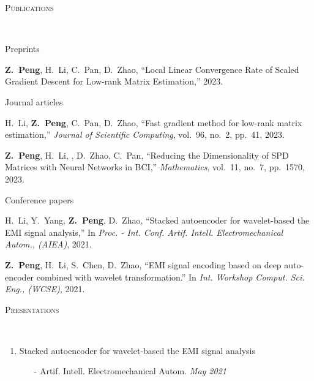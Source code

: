 \documentclass[a4paper, 10pt]{article}
\newenvironment{changemargin}[2]{%
  \begin{list}{}{%
    \setlength{\topsep}{0pt}%
    \setlength{\leftmargin}{#1}%
    \setlength{\rightmargin}{#2}%
    \setlength{\listparindent}{\parindent}%
    \setlength{\itemindent}{\parindent}%
    \setlength{\parsep}{\parskip}%
  }%
  \item[]}{\end{list}
}
\newcommand{\lineover}{
	\begin{changemargin}{-0.05in}{-0.05in}
		\vspace*{-8pt}
		\hrulefill \\
		\vspace*{-2pt}
	\end{changemargin}
}
\newcommand{\header}[1]{
	\begin{changemargin}{-0.5in}{-0.5in}
		\scshape{#1}\\
  	\lineover
	\end{changemargin}
}
\newenvironment{body} {
	\vspace*{-16pt}
	\begin{changemargin}{-0.3in}{-0.5in}
  }	
	{\end{changemargin}
}
\begin{document}
\bigskip
\header{\LARGE{Publications}}
\begin{body}
	\vspace{18pt}
	{\large Preprints}
	\begin{enumerate}[label={[{P}{{\arabic*}}]}]

\item \textbf{Z.~Peng}, H.~Li, C.~Pan, D.~Zhao, {``Local Linear Convergence Rate of Scaled Gradient Descent for Low-rank Matrix Estimation,''} 2023.\\

	\end{enumerate}
	{\large Journal articles}
	\begin{enumerate}[label={[{J}{{\arabic*}}]}]

\item H.~Li, \textbf{Z.~Peng}, C.~Pan, D.~Zhao, {``Fast gradient method for low-rank matrix estimation,''} \emph{Journal of Scientific Computing}, vol.~96, no.~2, pp.~41, 2023.\\

\item \textbf{Z.~Peng}, H.~Li, , D.~Zhao, C.~Pan, {``Reducing the Dimensionality of SPD Matrices with Neural Networks in BCI,''} \emph{Mathematics}, vol.~11, no.~7, pp.~1570, 2023.\\

	\end{enumerate}
	{\large Conference papers}

	\begin{enumerate}[label={[{C}{{\arabic*}}]}]
\item H.~Li, Y.~Yang, \textbf{Z.~Peng}, D.~Zhao, {``Stacked autoencoder for wavelet-based the EMI signal analysis,''} In \emph{Proc. - Int. Conf. Artif. Intell. Electromechanical Autom., (AIEA)}, 2021.\\
\item  \textbf{Z.~Peng}, H.~Li, S.~Chen, D.~Zhao, {``EMI signal encoding based on deep auto-encoder combined with wavelet transformation.''} In \emph{Int. Workshop Comput. Sci. Eng., (WCSE)}, 2021.\\
	\end{enumerate}
\end{body}

\bigskip
\header{\LARGE{Presentations}}
\begin{body}
	\vspace{18pt}
	\begin{enumerate}
	\item Stacked autoencoder for wavelet-based the EMI signal analysis
	\begin{itemize}
		\item[-] Artif. Intell. Electromechanical Autom. \hfill{} \emph{May 2021} 
	\end{itemize}
	\end{enumerate}
\end{body}
\end{document}
